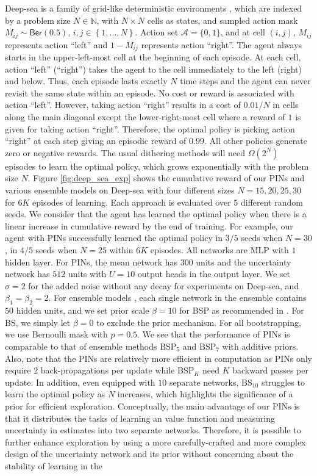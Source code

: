 \documentclass[letterpaper]{article} %
\newcommand{\Sp}[1]{\left(#1\right)}
\newcommand{\Bp}[1]{\left\{#1\right\}}
\theoremstyle{definition}
\begin{document}
Deep-sea is a family of grid-like deterministic environments \cite{osband2017deep}, which are indexed by a problem size $N \in \mathbb{N}$, with $N \times N$ cells as states, and sampled action mask $M_{ij}\sim\mathsf{Ber}(0.5)$, $i, j\in\Bp{1, \dots, N}$. Action set $\mathcal{A} = \{0, 1\}$, and at cell $\Sp{i, j}$, $M_{ij}$ represents action ``left'' and $1-M_{ij}$ represents action ``right''. The agent always starts in the upper-left-most cell at the beginning of each episode. At each cell, action ``left'' (``right'') takes the agent to the cell immediately to the left (right) and below. Thus, each episode lasts exactly $N$ time steps and the agent can never revisit the same state within an episode. No cost or reward is associated with action ``left''. However, taking action ``right'' results in a cost of $0.01/N$ in cells along the main diagonal except the lower-right-most cell where a reward of $1$ is given for taking action ``right''. Therefore, the optimal policy is picking action ``right'' at each step giving an episodic reward of $0.99$. All other policies generate zero or negative rewards. The usual dithering methods will need $\Omega\Sp{2^N}$ episodes to learn the optimal policy, which grows exponentially with the problem size $N$.  Figure \ref{fig:deep_sea_exp} shows the cumulative reward of our PINs and various ensemble models on Deep-sea with four different sizes $N = 15, 20, 25, 30$ for $6K$ episodes of learning. Each approach is evaluated over $5$ different random seeds. We consider that the agent has learned the optimal policy when there is a linear increase in cumulative reward by the end of training. For example, our agent with PINs successfully learned the optimal policy in $3/5$ seeds when $N = 30$, in $4/5$ seeds when $N = 25$ within $6K$ episodes. All networks are MLP with $1$ hidden layer. For PINs, the mean network has $300$ units and the uncertainty network has $512$ units with $U=10$ output heads in the output layer. We set $\sigma = 2$ for the added noise without any decay for experiments on Deep-sea, and $\beta_1 = \beta_2 = 2$. For ensemble models \cite{osband2018randomized}, each single network in the ensemble contains $50$ hidden units, and we set prior scale $\beta=10$ for BSP as recommended in \cite{osband2018randomized}. For BS, we simply let $\beta=0$ to exclude the prior mechanism. For all bootstrapping, we use Bernoulli mask with $p = 0.5$. We see that the performance of PINs is comparable to that of ensemble methods $\mathrm{BSP}_5$ and $\mathrm{BSP}_7$ with additive priors. Also, note that the PINs are relatively more efficient in computation as PINs only require $2$ back-propagations per update while $\mathrm{BSP}_K$ need $K$ backward passes per update. In addition, even equipped with $10$ separate networks, $\mathrm{BS}_{10}$ struggles to learn the optimal policy as $N$ increases, which highlights the significance of a prior for efficient exploration.  Conceptually, the main advantage of our PINs is that it distributes the tasks of learning an value function and measuring uncertainty in estimates into two separate networks. Therefore, it is possible to further enhance exploration by using a more carefully-crafted and more complex design of the uncertainty network and its prior without concerning about the stability of learning in the 
\end{document}
